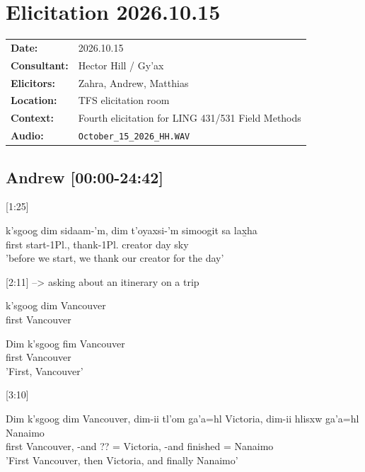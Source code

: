 \renewcommand{\ElicitationDate}{2026.10.15}

\section{Elicitation \ElicitationDate}

\begin{tabular}{ll}
\textbf{Date:} & \ElicitationDate \\
\textbf{Consultant:} & Hector Hill / Gy'ax \\
\textbf{Elicitors:} & Zahra, Andrew, Matthias \\
\textbf{Location:} & TFS elicitation room \\
\textbf{Context:} & Fourth elicitation for LING 431/531 Field Methods \\
\textbf{Audio:} & \texttt{October\_15\_2026\_HH.WAV} \\
\end{tabular}

\subsection{Andrew [00:00-24:42]}

[1:25]
\begin{exe}
\ex \gll k'sgoog̱ dim sidaam-'m, dim t'oyaxsi-'m simoogit sa lax̱ha\\
first \Fut{} start-1Pl.\Ii{}, \Fut{} thank-1Pl.\Ii{} creator day sky\\
'before we start, we thank our creator for the day'
\end{exe}

[2:11] --> asking about an itinerary on a trip
\begin{exe}
\ex \begin{xlist}
\item \gll * k'sgoog̱ dim Vancouver\\
{} first \Fut{} Vancouver \\
\item \gll Dim k'sgoog̱ fim Vancouver\\
\Fut{} first \Fut{} Vancouver\\
'First, Vancouver'
\end{xlist}
\end{exe}

[3:10]
\begin{exe}
\ex \gll Dim k'sgoog̱ dim Vancouver, dim-ii tl'om ga'a=hl Victoria, dim-ii hlisxw ga'a=hl Nanaimo\\
\Fut{} first \Fut{} Vancouver, \Fut{}-and ?? \Loc{}=\Cn{} Victoria, \Fut{}-and finished \Loc{}=\Cn{} Nanaimo\\
'First Vancouver, then Victoria, and finally Nanaimo'
\end{exe}

